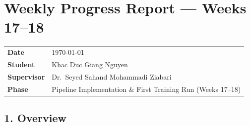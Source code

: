 
\section*{Weekly Progress Report — Weeks 17--18}

\begin{tabular}{ll}
    \textbf{Date}       & \today \\
    \textbf{Student}    & Khac Duc Giang Nguyen \\
    \textbf{Supervisor} & Dr.\ Seyed Sahand Mohammadi Ziabari \\
    \textbf{Phase}      & Pipeline Implementation \& First Training Run (Weeks 17--18) \\
\end{tabular}

\vspace{1em}

\subsection*{1. Overview}

